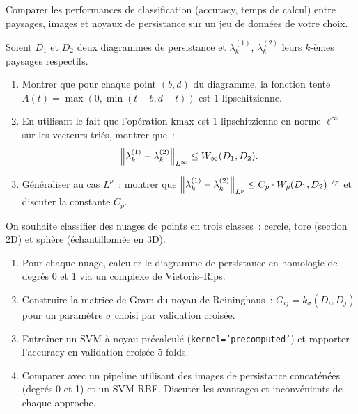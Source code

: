 \begin{exercice}
Comparer les performances de classification (accuracy, temps de
calcul) entre paysages, images et noyaux de persistance sur un
jeu de donn\'ees de votre choix.
\end{exercice}

\begin{exercice}
Soient $D_1$ et $D_2$ deux diagrammes de persistance et
$\lambda_k^{(1)}$, $\lambda_k^{(2)}$ leurs $k$-\`emes paysages respectifs.
\begin{enumerate}
  \item Montrer que pour chaque point $(b, d)$ du diagramme, la fonction
        tente $\Lambda(t) = \max(0, \min(t - b, d - t))$ est $1$-lipschitzienne.
  \item En utilisant le fait que l'op\'eration $\mathrm{kmax}$ est
        $1$-lipschitzienne en norme $\ell^\infty$ sur les vecteurs tri\'es,
        montrer que~:
        \[
          \left\| \lambda_k^{(1)} - \lambda_k^{(2)} \right\|_{L^\infty}
          \leq W_\infty(D_1, D_2).
        \]
  \item G\'en\'eraliser au cas $L^p$~: montrer que
        $\left\| \lambda_k^{(1)} - \lambda_k^{(2)} \right\|_{L^p}
        \leq C_p \cdot W_p(D_1, D_2)^{1/p}$
        et discuter la constante $C_p$.
\end{enumerate}
\end{exercice}

\begin{exercice}
On souhaite classifier des nuages de points en trois classes~:
cercle, tore (section 2D) et sph\`ere (\'echantillonn\'ee en 3D).
\begin{enumerate}
  \item Pour chaque nuage, calculer le diagramme de persistance en
        homologie de degr\'es 0 et 1 via un complexe de Vietoris--Rips.
  \item Construire la matrice de Gram du noyau de Reininghaus~:
        $G_{ij} = k_\sigma(D_i, D_j)$ pour un param\`etre $\sigma$ choisi
        par validation crois\'ee.
  \item Entra\^iner un SVM \`a noyau pr\'ecalcul\'e (\texttt{kernel='precomputed'})
        et rapporter l'accuracy en validation crois\'ee 5-folds.
  \item Comparer avec un pipeline utilisant des images de persistance
        concat\'en\'ees (degr\'es 0 et 1) et un SVM RBF. Discuter les
        avantages et inconv\'enients de chaque approche.
\end{enumerate}
\end{exercice}
